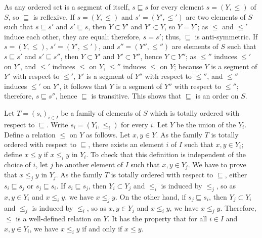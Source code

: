 \documentclass{article}
\begin{document}
\begin{solution}[\ref{exe:mfln3otu}]
  \label{sol:dnerb46y}
  As any ordered set is a segment of itself, \(s \sqsubseteq s\) for
  every element \(s = (Y, \leq)\) of \(S\), so \(\sqsubseteq\) is
  reflexive.  If \(s = (Y, \leq)\) and \(s' = (Y', \leq')\) are two
  elements of \(S\) such that \(s \sqsubseteq s'\) and
  \(s' \sqsubseteq s\), then \(Y \subset Y'\) and \(Y' \subset Y\), so
  \(Y = Y'\); as \(\leq\) and \(\leq'\) induce each other, they are
  equal; therefore, \(s = s'\); thus, \(\sqsubseteq\) is
  anti-symmetric.  If \(s = (Y, \leq)\), \(s' = (Y', \leq')\), and
  \(s'' = (Y'', \leq'')\) are elements of \(S\) such that
  \(s \sqsubseteq s'\) and \(s' \sqsubseteq s''\), then
  \(Y \subset Y'\) and \(Y' \subset Y''\), hence \(Y \subset Y''\); as
  \(\leq''\) induces \(\leq'\) on \(Y'\), and \(\leq'\) induces
  \(\leq\) on \(Y\), \(\leq''\) induces \(\leq\) on \(Y\); because
  \(Y\) is a segment of \(Y'\) with respect to \(\leq'\), \(Y'\) is a
  segment of \(Y''\) with respect to \(\leq''\), and \(\leq''\)
  induces \(\leq'\) on \(Y'\), it follows that \(Y\) is a segment of
  \(Y''\) with respect to \(\leq''\); therefore,
  \(s \sqsubseteq s''\), hence \(\sqsubseteq\) is transitive.  This
  shows that \(\sqsubseteq\) is an order on \(S\).

  Let \(T = (s_i)_{i \in I}\) be a family of elements of \(S\) which
  is totally ordered with respect to \(\sqsubseteq\).  Write
  \(s_i = (Y_i, \leq_i)\) for every \(i\).  Let \(Y\) be the union of
  the \(Y_i\).  Define a relation \(\leq\) on \(Y\) as follows.  Let
  \(x, y \in Y\).  As the family \(T\) is totally ordered with respect
  to \(\sqsubseteq\), there exists an element \(i\) of \(I\) such that
  \(x, y \in Y_i\); define \(x \leq y\) if \(x \leq_i y\) in \(Y_i\).
  To check that this definition is independent of the choice of \(i\),
  let \(j\) be another element of \(I\) such that \(x, y \in Y_j\).
  We have to prove that \(x \leq_j y\) in \(Y_j\).  As the family
  \(T\) is totally ordered with respect to \(\sqsubseteq\), either
  \(s_i \sqsubseteq s_j\) or \(s_j \sqsubseteq s_i\).  If
  \(s_i \sqsubseteq s_j\), then \(Y_i \subset Y_j\) and \(\leq_i\) is
  induced by \(\leq_j\), so as \(x, y \in Y_i\) and \(x \leq_i y\), we
  have \(x \leq_j y\).  On the other hand, if \(s_j \sqsubseteq s_i\),
  then \(Y_j \subset Y_i\) and \(\leq_j\) is induced by \(\leq_i\), so
  as \(x, y \in Y_j\) and \(x \leq_i y\), we have \(x \leq_j y\).
  Therefore, \(\leq\) is a well-defined relation on \(Y\).  It has the
  property that for all \(i \in I\) and \(x, y \in Y_i\), we have
  \(x \leq_i y\) if and only if \(x \leq y\).


\end{solution}
\end{document}
